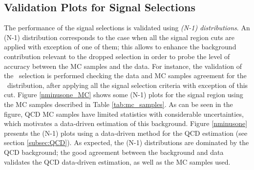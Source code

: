 \subsection{Validation Plots for Signal Selections}
\label{subsec:ValidationSignalSelections}

The performance of the signal selections is validated using \textit{(N-1) distributions}.
An (N-1) distribution corresponds to the case when all the signal region cuts
are applied with exception of one of them; this allows to enhance 
the background contribution relevant to the dropped selection in order
to probe the level of accuracy between the MC samples and the data. For instance, the 
validation of the \MET~selection is performed checking the 
data and MC samples agreement for the \MET~distribution, after applying 
all the signal selection criteria with exception of this cut. Figure \ref{nminusone_MC} shows 
some (N-1) plots for the signal region using the MC samples described in 
Table \ref{tab:mc_samples}. As can be seen in the figure, QCD MC samples 
have limited statistics with considerable uncertainties, which 
motivates a data-driven estimation of this background. Figure \ref{nminusone} presents
the (N-1) plots using a data-driven method for the QCD 
estimation (see section \ref{subsec:QCD}). As expected, the (N-1) 
distributions are dominated by the QCD background; the good agreement 
between the background and data validates the QCD data-driven estimation, as well
as the MC samples used.



